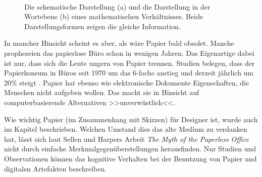 \begin{figure}
        \myfloatalign
         \quad
         \\
        \caption[Darstellungsformen \newline \citep{Johnson:2009}]{Die schematische Darstellung (a) und die Darstellung in der Wortebene (b) eines mathematischen Verhältnisses. Beide Darstellungsformen zeigen die gleiche Information. }\label{fig:johnsonDarstellungsformen}
\end{figure}

\medskip In mancher Hinsicht scheint es aber, als wäre Papier bald obsolet. Manche prophezeien das papierlose Büro schon in wenigen Jahren. Das Eigenartige dabei ist nur, dass sich die Leute ungern von Papier trennen. Studien belegen, dass der Papierkonsum in Büros seit 1970 um das 6-fache anstieg und derzeit jährlich um 20\% steigt \citep{seybold:1992}. Papier hat ebenso wie elektronische Dokumente Eigenschaften, die Menschen nicht aufgeben wollen. Das macht sie in Hinsicht auf computerbasierende Alternativen >>unverwüstlich<<. \citep{Luff:1992} 

\medskip Wie wichtig Papier (im Zusammenhang mit Skizzen) für Designer ist, wurde auch im Kapitel  beschrieben. Welchen Umstand dies das alte Medium zu verdanken hat, lässt sich laut Sellen und Harpers Arbeit \emph{The Myth of the Paperless Office} \citep{Sellen:2003} nicht durch einfache Merkmalgegenüberstellungen herausfinden. Nur Studien und Observationen können das kognitive Verhalten bei der Benutzung von Papier und digitalen Artefakten beschreiben. 

